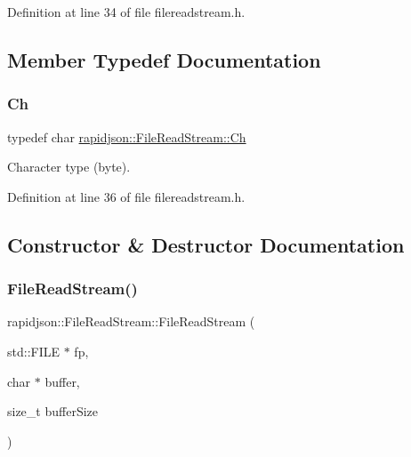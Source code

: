 Definition at line 34 of file filereadstream.\+h.



\subsection{Member Typedef Documentation}
\mbox{\label{classrapidjson_1_1_file_read_stream_a4a5f34875b40d22def206c9a09ecd929}} 
\subsubsection{\texorpdfstring{Ch}{Ch}}
{\footnotesize\ttfamily typedef char \mbox{\hyperlink{classrapidjson_1_1_file_read_stream_a4a5f34875b40d22def206c9a09ecd929}{rapidjson\+::\+File\+Read\+Stream\+::\+Ch}}}



Character type (byte). 



Definition at line 36 of file filereadstream.\+h.



\subsection{Constructor \& Destructor Documentation}
\mbox{\label{classrapidjson_1_1_file_read_stream_a72b610ada5d86e8977a2bc1f2f4c0808}} 
\subsubsection{\texorpdfstring{FileReadStream()}{FileReadStream()}}
{\footnotesize\ttfamily rapidjson\+::\+File\+Read\+Stream\+::\+File\+Read\+Stream (\begin{DoxyParamCaption}\item[{std\+::\+F\+I\+LE $\ast$}]{fp,  }\item[{char $\ast$}]{buffer,  }\item[{size\+\_\+t}]{buffer\+Size }\end{DoxyParamCaption})}



